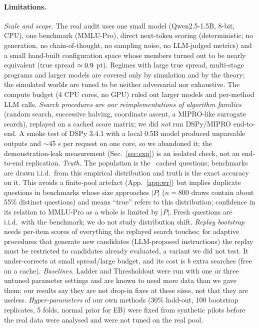 \paragraph{Limitations.}
\emph{Scale and scope.} The real audit uses one small model (Qwen2.5-1.5B, 8-bit, CPU), one benchmark (MMLU-Pro), direct next-token scoring (deterministic; no generation, no chain-of-thought, no sampling noise, no LLM-judged metrics) and a small hand-built configuration space whose members turned out to be nearly equivalent (true spread $\approx0.9$ pt). Regimes with large true spread, multi-stage programs and larger models are covered only by simulation and by the theory; the simulated worlds are tuned to be neither adversarial nor exhaustive. The compute budget (4 CPU cores, no GPU) ruled out larger models and per-method LLM calls.
\emph{Search procedures are our reimplementations of algorithm families} (random search, successive halving, coordinate ascent, a MIPRO-like surrogate search), replayed on a cached score matrix; we did \emph{not} run DSPy/MIPRO end-to-end. A smoke test of DSPy 3.4.1 with a local 0.5B model produced unparsable outputs and ${\sim}$45 s per request on one core, so we abandoned it; the demonstration-leak measurement (Sec.~\ref{sec:exp}) is an isolated check, not an end-to-end replication.
\emph{Truth.} The population is the \RealN\ cached questions; benchmarks are drawn i.i.d.\ from this empirical distribution and truth is the exact accuracy on it. This avoids a finite-pool artefact (App.~\ref{app:wr}) but implies duplicate questions in benchmarks whose size approaches $|P|$ ($n{=}800$ draws contain about 55\% distinct questions) and means ``true'' refers to this distribution; confidence in its relation to MMLU-Pro as a whole is limited by $|P|$. Fresh questions are i.i.d.\ with the benchmark; we do not study distribution shift.
\emph{Replay bootstrap} needs per-item scores of everything the replayed search touches; for adaptive procedures that generate new candidates (LLM-proposed instructions) the replay must be restricted to candidates already evaluated, a variant we did not test. It under-corrects at small spread/large budget, and its cost is $b$ extra searches (free on a cache).
\emph{Baselines.} Ladder and Thresholdout were run with one or three untuned parameter settings and are known to need more data than we gave them; our results say they are not drop-in fixes at these sizes, not that they are useless.
\emph{Hyper-parameters} of our own methods (30\% hold-out, 100 bootstrap replicates, 5 folds, normal prior for EB) were fixed from synthetic pilots before the real data were analysed and were not tuned on the real pool.
